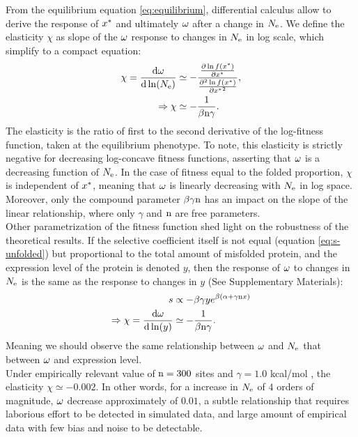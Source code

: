 \documentclass{article}
\begin{document}
From the equilibrium equation \ref{eq:equilibrium}, differential calculus allow to derive the response of $x^{*}$ and ultimately $\omega$ after a change in $N_{\mathrm{e}}$.
We define the elasticity $\chi$ as slope of the $\omega$ response to changes in $N_{\mathrm{e}}$ in log scale, which simplify to a compact equation: 
\begin{align}
\chi = \frac{ \mathrm{d} \omega}{\mathrm{d} \ln (N_{\mathrm{e}})} & \simeq - \frac{\frac{ \partial \ln f(x^{*}) }{\partial {x^{*}}}}{\frac{ \partial^2 \ln f(x^{*}) }{\partial {x^{*}}^2}}, \\
\Rightarrow \chi & \simeq -\dfrac{1}{\beta \text{n} \gamma}.
\end{align}
The elasticity is the ratio of first to the second derivative of the log-fitness function, taken at the equilibrium phenotype. To note, this elasticity is strictly negative for decreasing log-concave fitness functions, asserting that $\omega$ is a decreasing function of $N_{\mathrm{e}}$.
In the case of fitness equal to the folded proportion, $\chi$ is independent of $x^{*}$, meaning that $\omega$ is linearly decreasing with $N_{\mathrm{e}}$ in log space.
Moreover, only the compound parameter $\beta \gamma \text{n}$ has an impact on the slope of the linear relationship, where only $\gamma$ and $\text{n}$ are free parameters. \\

Other parametrization of the fitness function shed light on the robustness of the theoretical results.
If the selective coefficient itself is not equal (equation \ref{eq:s-unfolded}) but proportional to the total amount of misfolded protein, and the expression level of the protein is denoted $y$, then the response of $\omega$ to changes in $N_{\mathrm{e}}$ is the same as the response to changes in $y$ (See Supplementary Materials):
\begin{align}
s & \propto - \beta \gamma y  e^{\beta(\alpha + \gamma \text{n} x)} \\
\Rightarrow \chi = \frac{ \mathrm{d} \omega}{\mathrm{d} \ln (y)} & \simeq -\dfrac{1}{\beta \text{n} \gamma}.
\end{align}
Meaning we should observe the same relationship between $\omega$ and $N_{\mathrm{e}}$ that between $\omega$ and expression level.\\

Under empirically relevant value of $\text{n}=300$ sites and $\gamma=1.0$ kcal/mol \cite{Zeldovich2007}, the elasticity $\chi \simeq -0.002$.
In other words, for a increase in $N_{\mathrm{e}}$ of $4$ orders of magnitude, $\omega$ decrease approximately of $0.01$, a subtle relationship that requires laborious  effort to be detected in simulated data, and large amount of empirical data with few bias and noise to be detectable.
\end{document}

